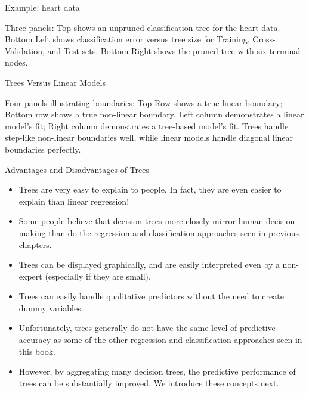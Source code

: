 \documentclass[aspectratio=169, 11pt]{beamer}
\begin{document}
\begin{frame}{Example: heart data}
\begin{tcolorbox}[colback=LightGray,title=Figure]
Three panels: Top shows an unpruned classification tree for the heart data. Bottom Left shows classification error versus tree size for Training, Cross-Validation, and Test sets. Bottom Right shows the pruned tree with six terminal nodes.
\end{tcolorbox}
\end{frame}

\begin{frame}{Trees Versus Linear Models}
\begin{tcolorbox}[colback=LightGray,title=Figure]
Four panels illustrating boundaries: 
Top Row shows a true linear boundary; Bottom row shows a true non-linear boundary. 
Left column demonstrates a linear model's fit; Right column demonstrates a tree-based model's fit. Trees handle step-like non-linear boundaries well, while linear models handle diagonal linear boundaries perfectly.
\end{tcolorbox}
\end{frame}

\begin{frame}{Advantages and Disadvantages of Trees}
\begin{itemize}
    \item Trees are very easy to explain to people. In fact, they are even easier to explain than linear regression!
    \item Some people believe that decision trees more closely mirror human decision-making than do the regression and classification approaches seen in previous chapters.
    \item Trees can be displayed graphically, and are easily interpreted even by a non-expert (especially if they are small).
    \item Trees can easily handle qualitative predictors without the need to create dummy variables.
    \item Unfortunately, trees generally do not have the same level of predictive accuracy as some of the other regression and classification approaches seen in this book.
    \item However, by aggregating many decision trees, the predictive performance of trees can be substantially improved. We introduce these concepts next.
\end{itemize}
\end{frame}
\end{document}
